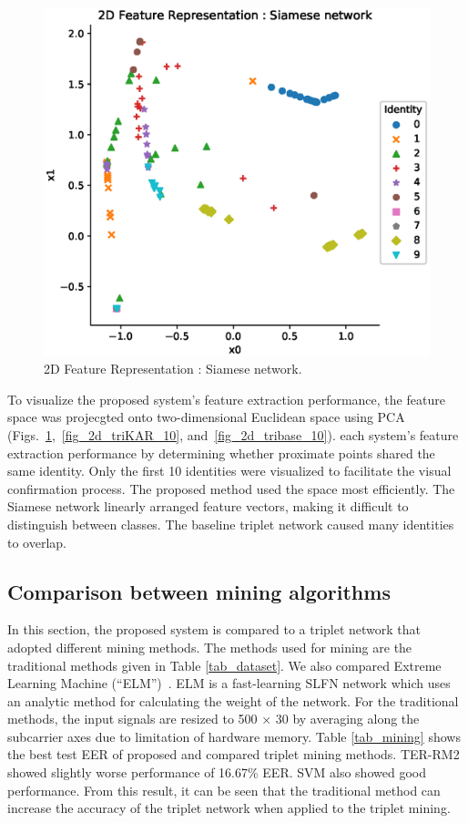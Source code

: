 \begin{figure}[!ht]
    \includegraphics[width=\textwidth]{fig_2d_siam_10_v1.eps}
    \caption{2D Feature Representation : Siamese network.} \label{fig_2d_siam_10}
\end{figure}
To visualize the proposed system's feature extraction performance, the feature space was projecgted onto two-dimensional Euclidean space using PCA (Figs.~\ref{fig_2d_siam_10},~\ref{fig_2d_triKAR_10}, and~\ref{fig_2d_tribase_10}). each system's feature extraction performance by determining whether proximate points shared the same identity. Only the first 10 identities were visualized to facilitate the visual confirmation process.
The proposed method used the space most efficiently. The Siamese network linearly arranged feature vectors, making it difficult to distinguish between classes. The baseline triplet network caused many identities to overlap.
\fi
\subsection{Comparison between mining algorithms}
In this section, the proposed system is compared to a triplet network that adopted different mining methods. The methods used for mining are the traditional methods given in Table \ref{tab_dataset}. 
We also compared Extreme Learning Machine (``ELM'')~\cite{huang2006extreme}.
ELM is a fast-learning SLFN network which uses an analytic method for calculating the weight of the network.
For the traditional methods, the input signals are resized to 500 × 30 by averaging along the subcarrier axes due to limitation of hardware memory.
Table \ref{tab_mining} shows the best test EER of proposed and compared triplet mining methods. TER-RM2 showed slightly worse performance of 16.67\% EER. SVM also showed good performance.
From this result, it can be seen that the traditional method can increase the accuracy of the triplet network when applied to the triplet mining.



